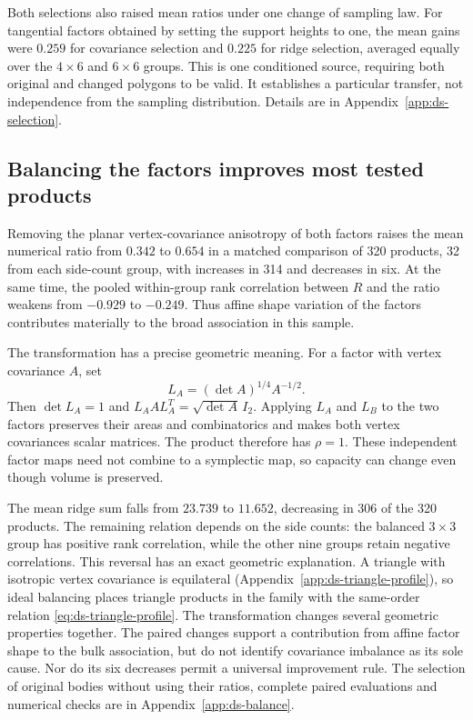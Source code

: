 Both selections also raised mean ratios under one change of sampling law. For tangential
factors obtained by setting the support heights to one, the mean gains
were $0.259$ for covariance selection and $0.225$ for ridge selection,
averaged equally over the $4\times6$ and $6\times6$ groups. This is one
conditioned source, requiring both original and changed polygons to be
valid. It establishes a particular transfer, not independence from the
sampling distribution. Details are in Appendix~\ref{app:ds-selection}.

\subsection{Balancing the factors improves most tested products}

Removing the planar vertex-covariance anisotropy of both factors raises
the mean numerical ratio from $0.342$ to $0.654$ in a matched comparison
of 320 products, 32 from each side-count group, with increases in 314
and decreases in six. At the same time, the pooled within-group rank correlation between $R$ and the ratio
weakens from $-0.929$ to $-0.249$. Thus affine shape variation of the
factors contributes materially to the broad association in this sample.

The transformation has a precise geometric meaning. For a factor with
vertex covariance $A$, set
\[
 L_A=(\det A)^{1/4}A^{-1/2}.
\]
Then $\det L_A=1$ and
$L_A A L_A^T=\sqrt{\det A}\,I_2$. Applying $L_A$ and $L_B$ to the two
factors preserves their areas and combinatorics and makes both vertex
covariances scalar matrices. The product therefore has $\rho=1$.
These independent factor maps need not combine to a symplectic map, so
capacity can change even though volume is preserved.

The mean ridge sum falls from $23.739$ to $11.652$, decreasing in 306 of
the 320 products. The remaining relation depends on the side counts:
the balanced $3\times3$ group has positive rank correlation, while the
other nine groups retain negative correlations. This reversal has an
exact geometric explanation. A triangle with isotropic vertex covariance
is equilateral (Appendix~\ref{app:ds-triangle-profile}), so ideal balancing
places triangle products in the family with the same-order relation
\eqref{eq:ds-triangle-profile}. The transformation changes
several geometric properties together. The paired changes support a contribution from affine factor shape
to the bulk association, but do not identify covariance imbalance as its
sole cause. Nor do its six decreases permit a universal improvement
rule. The selection of original bodies without using their ratios, complete
paired evaluations and numerical checks are in Appendix~\ref{app:ds-balance}.

